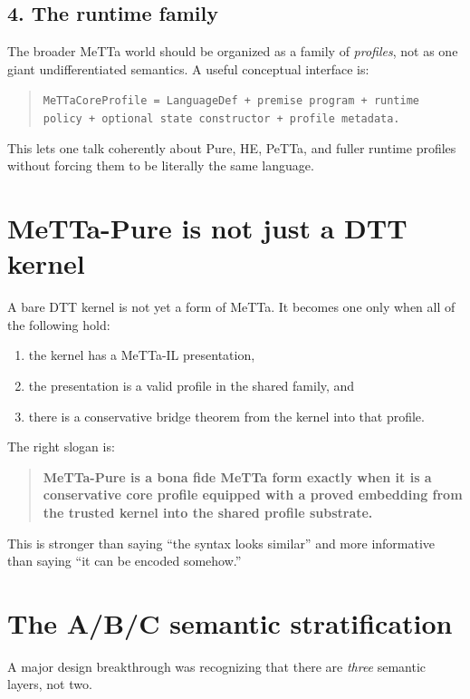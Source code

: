 \documentclass[11pt]{article}
\begin{document}
\subsection{4. The runtime family}

The broader MeTTa world should be organized as a family of \emph{profiles}, not as one giant undifferentiated semantics. A useful conceptual interface is:

\begin{quote}
\texttt{MeTTaCoreProfile = LanguageDef + premise program + runtime policy + optional state constructor + profile metadata.}
\end{quote}

This lets one talk coherently about Pure, HE, PeTTa, and fuller runtime profiles without forcing them to be literally the same language.

\section{MeTTa-Pure is not just a DTT kernel}

A bare DTT kernel is not yet a form of MeTTa. It becomes one only when all of the following hold:
\begin{enumerate}
  \item the kernel has a MeTTa-IL presentation,
  \item the presentation is a valid profile in the shared family, and
  \item there is a conservative bridge theorem from the kernel into that profile.
\end{enumerate}

The right slogan is:

\begin{quote}
\textbf{MeTTa-Pure is a bona fide MeTTa form exactly when it is a conservative core profile equipped with a proved embedding from the trusted kernel into the shared profile substrate.}
\end{quote}

This is stronger than saying ``the syntax looks similar'' and more informative than saying ``it can be encoded somehow.''

\section{The A/B/C semantic stratification}

A major design breakthrough was recognizing that there are \emph{three} semantic layers, not two.
\end{document}
